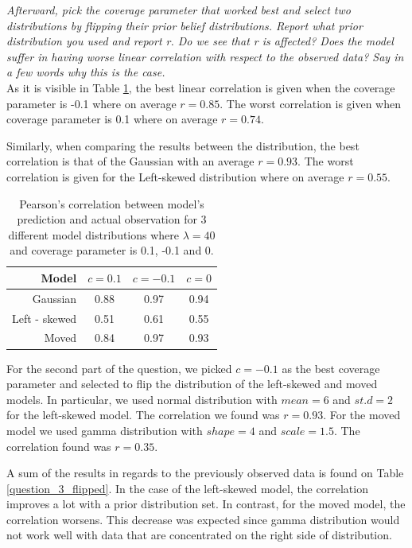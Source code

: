 \documentclass[11pt,a4paper,oneside]{article}
\begin{document}
\textit{Afterward, pick the coverage parameter that worked best and select two distributions by flipping their prior belief distributions. Report what prior distribution you used and report r. Do we see that r is affected? Does the model suffer in having worse linear correlation with respect to the observed data? Say in a few words why this is the case.}\\

As it is visible in Table \ref{question_3}, the best linear correlation is given when the coverage parameter is -0.1 where on average $r = 0.85$. The worst correlation is given when coverage parameter is 0.1 where on average $r = 0.74$.

Similarly, when comparing the results between the distribution, the best correlation is that of the Gaussian with an average $r = 0.93$. The worst correlation is given for the Left-skewed distribution where on average $r = 0.55$.

\begin{table}[ht]
\centering
\begin{tabular}{rccc}
  \hline
 Model & $c = 0.1$ & $c = -0.1$ & $c = 0$ \\ 
  \hline
    Gaussian & 0.88 & 0.97 & 0.94\\ 
    Left - skewed & 0.51 & 0.61 & 0.55\\ 
    Moved & 0.84 & 0.97 & 0.93\\ 
   \hline
\end{tabular}
\caption{Pearson's correlation between model's prediction and actual observation for 3 different model distributions where $\lambda = 40$ and coverage parameter is 0.1, -0.1 and 0.}
\label{question_3}
\end{table}

For the second part of the question, we picked $c = -0.1$ as the best coverage parameter and selected to flip the distribution of the left-skewed and moved models. In particular, we used normal distribution with $mean = 6$ and $st.d = 2$ for the left-skewed model. The correlation we found was $r = 0.93$. For the moved model we used gamma distribution with $shape = 4$ and $scale = 1.5$. The correlation found was $r = 0.35$.

A sum of the results in regards to the previously observed data is found on Table \ref{question_3_flipped}. In the case of the left-skewed model, the correlation improves a lot with a prior distribution set. In contrast, for the moved model, the correlation worsens. This decrease was expected since gamma distribution would not work well with data that are concentrated on the right side of distribution.
\end{document}
